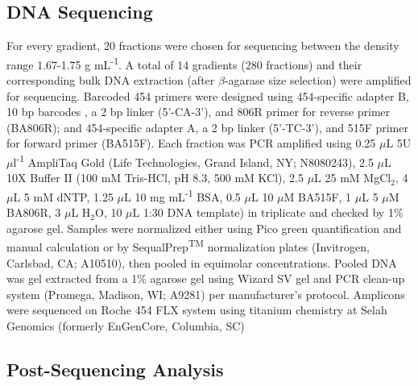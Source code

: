 \subsection{DNA Sequencing}  For every gradient, 20 fractions were chosen for
sequencing between the density range 1.67-1.75 g mL\textsuperscript{-1}.
A total of 14 gradients (280 fractions) and their corresponding bulk DNA
extraction (after $\beta$-agarase size selection) were amplified for
sequencing. Barcoded 454 primers were designed using 454-specific adapter B, 10
bp barcodes \cite{Hamady_2008}, a 2 bp linker (5'-CA-3'), and 806R primer for
reverse primer (BA806R); and 454-specific adapter A, a 2 bp linker (5'-TC-3'),
and 515F primer for forward primer (BA515F). Each fraction was PCR amplified
using 0.25 $\mu$L 5U $\mu$l\textsuperscript{-1} AmpliTaq Gold (Life
Technologies, Grand Island, NY; N8080243), 2.5 $\mu$L 10X Buffer II (100 mM
Tris-HCl, pH 8.3, 500 mM KCl), 2.5 $\mu$L 25 mM MgCl$_{2}$, 4 $\mu$L 5 mM dNTP,
1.25 $\mu$L 10 mg mL\textsuperscript{-1} BSA, 0.5 $\mu$L 10 $\mu$M BA515F,
1 $\mu$L 5 $\mu$M BA806R, 3 $\mu$L H$_{2}$O, 10 $\mu$L 1:30 DNA template) in
triplicate and checked by 1\% agarose gel. Samples were normalized either using
Pico green quantification and manual calculation or by
SequalPrep\textsuperscript{TM} normalization plates (Invitrogen, Carlsbad, CA;
A10510), then pooled in equimolar concentrations. Pooled DNA was gel extracted
from a 1\% agarose gel using Wizard SV gel and PCR clean-up system (Promega,
Madison, WI; A9281) per manufacturer's protocol.  Amplicons were sequenced on
Roche 454 FLX system using titanium chemistry at Selah Genomics (formerly
EnGenCore, Columbia, SC)    

\subsection{Post-Sequencing Analysis}
